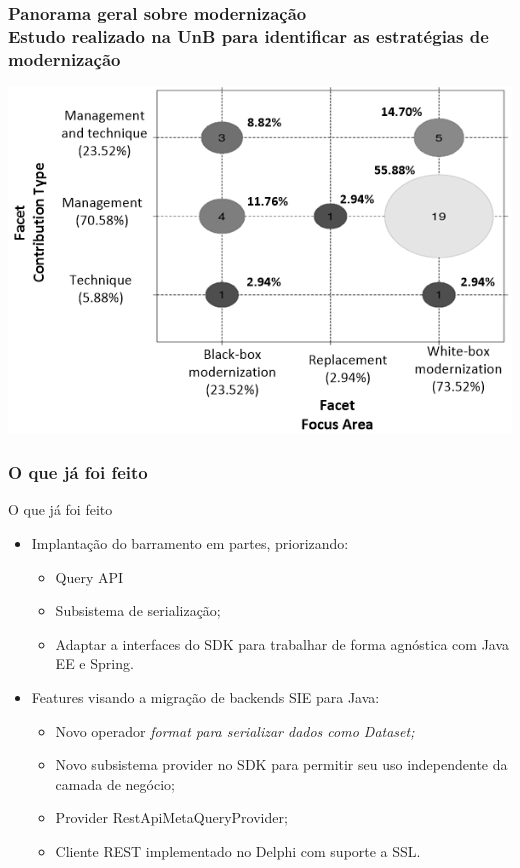 \documentclass{beamer}
\begin{document}
\begin{frame}
\frametitle{Panorama geral sobre modernização  \\ \small{Estudo realizado na UnB para identificar as estratégias de modernização}}


\centering
\includegraphics[scale=0.45]{img/bubble_diagram.png}

\end{frame}






\begin{frame}
\frametitle{O que já foi feito}

\begin{exampleblock}{O que já foi feito}
	
	\begin{itemize}
		\item<1->Implantação do barramento em partes, priorizando:
			\begin{itemize}
				\item<1->Query API
				\item<1->Subsistema de serialização;
				\item<1->Adaptar a interfaces do SDK para trabalhar de forma agnóstica com Java EE e Spring. 
			\end{itemize}
		\item<1->Features visando a migração de backends SIE para Java:
			\begin{itemize}
				\item<1->Novo operador \em{format} para serializar dados como Dataset;
				\item<1->Novo subsistema provider no SDK para permitir seu uso independente da camada de negócio;
				\item<1->Provider RestApiMetaQueryProvider;
				\item<1->Cliente REST implementado no Delphi com suporte a SSL.
			\end{itemize}
		
	\end{itemize}
	
\end{exampleblock}


\end{frame}
\end{document}
